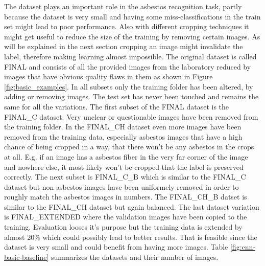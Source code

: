 The dataset plays an important role in the asbestos recognition task, partly because the dataset is very small and having some miss-classifications in the train set might lead to poor performance. Also with different cropping techniques it might get useful to reduce the size of the training by removing certain images. As will be explained in the next section cropping an image might invalidate the label, therefore making learning almost impossible. The original dataset is called FINAL and consists of all the provided images from the laboratory reduced by images that have obvious quality flaws in them as shown in Figure  \ref{fig:basic_examples}. In all subsets only the training folder has been altered, by adding or removing images. The test set has never been touched and remains the same for all the variations. The first subset of the FINAL dataset is the FINAL\_C dataset. Very unclear or questionable images have been removed from the training folder. In the FINAL\_CH dataset even more images have been removed from the training data, especially asbestos images that have a high chance of being cropped in a way, that there won't be any asbestos in the crops at all. E.g. if an image has a asbestos fiber in the very far corner of the image and nowhere else, it most likely won't be cropped that the label is preserved correctly. The next subset is FINAL\_C\_B which is similar to the FINAL\_C dataset but non-asbestos images have been uniformely removed in order to roughly match the asbestos images in numbers. The FINAL\_CH\_B datset is similar to the FINAL\_CH dataset but again balanced. The last dataset variation is FINAL\_EXTENDED where the validation images have been copied to the training. Evaluation looses it's purpose but the training data is extended by almost 20\% which could possibly lead to better results. That is feasible since the dataset is very small and could benefit from having more images. Table \ref{fig:cnn-basic-baseline} summarizes the datasets and their number of images.

